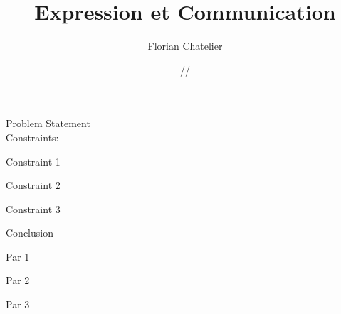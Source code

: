 \documentclass[11pt]{report}
\title{\textbf{Expression et Communication}}
\author{Florian Chatelier}
\date{\oldstylenums{00}/\oldstylenums{00}/\oldstylenums{00}}
\begin{document}
\maketitle
 
\begin{outline}
	\item Problem Statement \\ Constraints:
    \begin{outline}
    	\item Constraint 1
    	\item Constraint 2
    	\item Constraint 3

	\end{outline}
\end{outline}

\newpage

Conclusion
\par Par 1 
\par Par 2
\par Par 3
\end{document}
